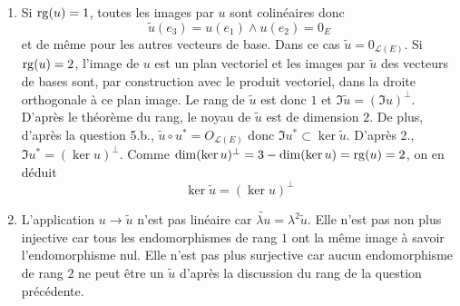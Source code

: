 \begin{enumerate}
 \item  Si $\operatorname{rg}(u)=1$, toutes les images par $u$ sont colinéaires donc 
\begin{displaymath}
\widetilde{u}(e_3)=u(e_1)\wedge u(e_2)=0_E 
\end{displaymath}
et de même pour les autres vecteurs de base. Dans ce cas $\widetilde{u}=0_{\mathcal{L}(E)}$.\newline
Si $\operatorname{rg}(u)=2$, l'image de $u$ est un plan vectoriel et les images par $\widetilde{u}$ des vecteurs de bases sont, par construction avec le produit vectoriel, dans la droite orthogonale à ce plan image. Le rang de $\widetilde{u}$ est donc $1$ et $\Im \widetilde{u}= (\Im u)^{\perp}$.\newline 
D'après le théorème du rang, le noyau de $\widetilde{u}$ est de dimension $2$. De plus, d'après la question 5.b., $\widetilde{u}\circ u^* = O_{\mathcal{L}(E)}$ donc $\Im u^* \subset \ker \widetilde{u}$. D'après 2., $\Im u^* = (\ker u)^{\perp}$. Comme $\dim(\ker u)^{\perp} = 3- \dim(\ker u)=\operatorname{rg}(u)=2$, on en déduit
\begin{displaymath}
 \ker \widetilde{u} = (\ker u)^{\perp}
\end{displaymath}

\item L'application $u \rightarrow \widetilde u$ n'est pas linéaire car $\widetilde{\lambda u} = \lambda^2 \widetilde{u}$.\newline
Elle n'est pas non plus injective car tous les endomorphismes de rang $1$ ont la même image à savoir l'endomorphisme nul.\newline
Elle n'est pas plus surjective car aucun endomorphisme de rang $2$ ne peut être un $\widetilde u$ d'après la discussion du rang de la question précédente.
\end{enumerate}

